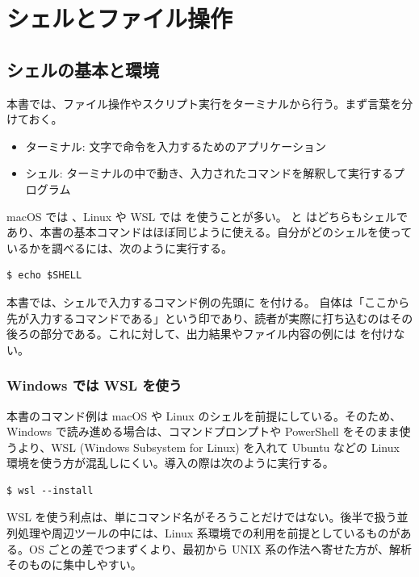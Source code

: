 \chapter{シェルとファイル操作}

\section{シェルの基本と環境}
\label{SEC:shell}
本書では、ファイル操作やスクリプト実行をターミナルから行う。まず言葉を分けておく。

\begin{itemize}
\item ターミナル: 文字で命令を入力するためのアプリケーション
\item シェル: ターミナルの中で動き、入力されたコマンドを解釈して実行するプログラム
\end{itemize}

macOS では 、Linux や WSL では  を使うことが多い。 と  はどちらもシェルであり、本書の基本コマンドはほぼ同じように使える。自分がどのシェルを使っているかを調べるには、次のように実行する。

\begin{lstlisting}[numbers=none, xleftmargin=2\zw]
$ echo $SHELL
\end{lstlisting}

本書では、シェルで入力するコマンド例の先頭に \code{\$} を付ける。\code{\$} 自体は「ここから先が入力するコマンドである」という印であり、読者が実際に打ち込むのはその後ろの部分である。これに対して、出力結果やファイル内容の例には \code{\$} を付けない。

\subsection{Windows では WSL を使う}

本書のコマンド例は macOS や Linux のシェルを前提にしている。そのため、Windows で読み進める場合は、コマンドプロンプトや PowerShell をそのまま使うより、WSL (Windows Subsystem for Linux) を入れて Ubuntu などの Linux 環境を使う方が混乱しにくい。導入の際は次のように実行する。

\begin{lstlisting}[numbers=none, xleftmargin=2\zw]
$ wsl --install
\end{lstlisting}

WSL を使う利点は、単にコマンド名がそろうことだけではない。後半で扱う並列処理や周辺ツールの中には、Linux 系環境での利用を前提としているものがある。OS ごとの差でつまずくより、最初から UNIX 系の作法へ寄せた方が、解析そのものに集中しやすい。

